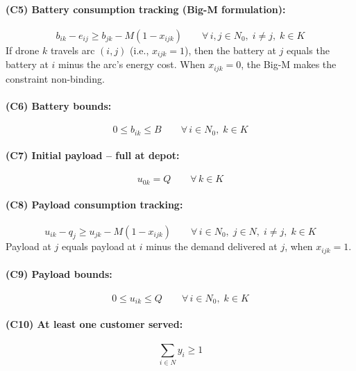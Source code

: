 \documentclass[12pt,a4paper]{article}
\begin{document}
\paragraph{(C5) Battery consumption tracking (Big-M formulation):}
\begin{equation}
  b_{ik} - e_{ij} \geq b_{jk} - M(1 - x_{ijk})
  \qquad \forall\, i,j \in N_0,\; i \neq j,\; k \in K
  \tag{C5}
\end{equation}
If drone $k$ travels arc $(i,j)$ (i.e., $x_{ijk} = 1$), then the battery at $j$ equals
the battery at $i$ minus the arc's energy cost. When $x_{ijk} = 0$, the Big-M makes
the constraint non-binding.

\paragraph{(C6) Battery bounds:}
\begin{equation}
  0 \leq b_{ik} \leq B
  \qquad \forall\, i \in N_0,\; k \in K
  \tag{C6}
\end{equation}

\paragraph{(C7) Initial payload -- full at depot:}
\begin{equation}
  u_{0k} = Q
  \qquad \forall\, k \in K
  \tag{C7}
\end{equation}

\paragraph{(C8) Payload consumption tracking:}
\begin{equation}
  u_{ik} - q_j \geq u_{jk} - M(1 - x_{ijk})
  \qquad \forall\, i \in N_0,\; j \in N,\; i \neq j,\; k \in K
  \tag{C8}
\end{equation}
Payload at $j$ equals payload at $i$ minus the demand delivered at $j$, when
$x_{ijk} = 1$.

\paragraph{(C9) Payload bounds:}
\begin{equation}
  0 \leq u_{ik} \leq Q
  \qquad \forall\, i \in N_0,\; k \in K
  \tag{C9}
\end{equation}

\paragraph{(C10) At least one customer served:}
\begin{equation}
  \sum_{i \in N} y_i \geq 1
  \tag{C10}
\end{equation}
\end{document}
